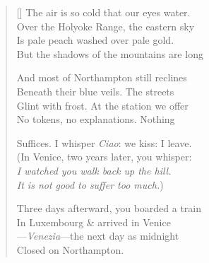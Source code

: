\label{ch:last_words}
\settowidth{\versewidth}{Suffices.  I whisper Ciao: we kiss: I leave.}
\begin{verse}[\versewidth]
The air is so cold that our eyes water.\\
Over the Holyoke Range, the eastern sky\\
Is pale peach washed over pale gold.\\
But the shadows of the mountains are long

And most of Northampton still reclines\\
Beneath their blue veils.  The streets\\
Glint with frost.  At the station we offer\\
No tokens, no explanations.   Nothing

Suffices.  I whisper \textit{Ciao}: we kiss: I leave.\\
(In Venice, two years later, you whisper:\\
\textit{I watched you walk back up the hill.\\
It is not good to suffer too much.})

Three days afterward, you boarded a train\\
In Luxembourg \& arrived in Venice\\
---\textit{Venezia}---the next day as midnight\\
\qquad Closed on Northampton.
\end{verse}
